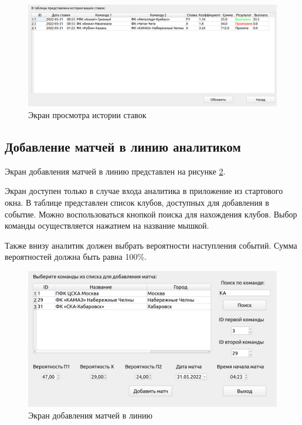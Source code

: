 \FloatBarrier
\begin{figure}[h]	
	\begin{center}
		\includegraphics[width=\linewidth]{inc/history.png}
	\end{center}
	\caption{Экран просмотра истории ставок}
	\label{fig::history}
\end{figure}
\FloatBarrier

\subsection{Добавление матчей в линию аналитиком}
Экран добавления матчей в линию представлен на рисунке \ref{fig::add}.

Экран доступен только в случае входа аналитика в приложение из стартового окна.
В таблице представлен список клубов, доступных для добавления в событие.
Можно воспользоваться кнопкой поиска для нахождения клубов.
Выбор команды осуществляется нажатием на название мышкой.

Также внизу аналитик должен выбрать вероятности наступления событий. 
Сумма вероятностей должна быть равна 100\%.

\FloatBarrier
\begin{figure}[h]	
	\begin{center}
		\includegraphics[width=\linewidth]{inc/addMatch.png}
	\end{center}
	\caption{Экран добавления матчей в линию}
	\label{fig::add}
\end{figure}
\FloatBarrier

